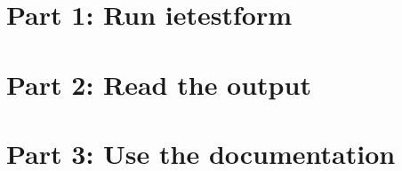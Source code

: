 \documentclass{tufte-handout}
\begin{document}
\section{Part 1: Run ietestform}
 
 \begin{figure*}
 	{
 		}
 \end{figure*}


\section{Part 2: Read the output}

\section{Part 3: Use the documentation}
\end{document}
